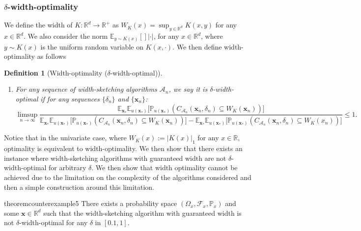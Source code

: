 \documentclass{article} %
\newtheorem{definition}{Definition}[section]
\theoremstyle{remark}
\theoremstyle{definition}      %
\begin{document}
\subsubsection{$\delta$-width-optimality}
We define the width of $K: \mathbb{R}^d \rightarrow \mathbb{R}^+$ as $W_{K}(x) = \sup_{y \in \mathbb{R}^d} K(x,y)$ for any $x \in \mathbb{R}^d$. We also consider the norm $\mathbb{E}_{y \sim K(x)}[]|\cdot|$, for any $x \in \mathbb{R}^d$, where $y \sim K(x)$ is the uniform random variable on $K(x,\cdot)$. We then define width-optimality as follows
\begin{definition}[Width-optimality ($\delta$-width-optimal)]
\begin{enumerate}[label=\arabic*),labelindent=0pt,itemsep=0pt,topsep=0pt]

\item For any sequence of width-sketching algorithms $\mathcal{A}_n$, we say it is \emph{$\delta$-width-optimal} if for any sequences $\{\delta_n\}$ and $\{\bm{x}_n\}$:
\begin{equation}
\limsup_{n \to \infty} 
\frac{
\mathbb{E}_{\bm{x}_*} \mathbb{E}_{u(\bm{x_*})}\big[\mathbb{P}_{u(\bm{x_*})}(C_{\mathcal{A}_n}(\bm{x}_n, \delta_n) \subseteq W_K(\bm{x}_n))\big]
}{
\mathbb{E}_{\bm{x}_*} \mathbb{E}_{u(\bm{x_*})}\big[\mathbb{P}_{u(\bm{x_*})}(C_{\mathcal{A}_n}(\bm{x}_n, \delta_n) \subseteq W_K(\bm{x}_n))\big]
-
\mathbb{E}_{\bm{x}_*} \mathbb{E}_{u(\bm{x_*})}\big[\mathbb{P}_{u(\bm{x_*})}(C_{\mathcal{A}_n}(\bm{x}_n, \delta_n) \subseteq W_K(x_n))\big]
} 
\le 1.
\end{equation}
\end{enumerate}
\end{definition}

Notice that in the univariate case, where $W_{K}(x) := |K(x)|_1$ for any $x \in \mathbb{R}$, optimality is equivalent to width-optimality. We then show that there exists an instance where width-sketching algorithms with guaranteed width are not $\delta$-width-optimal for arbitrary $\delta$. 
We then show that width optimality cannot be achieved due to the limitation on the complexity of the algorithms considered and then a simple construction around this limitation.
\begin{restatable}{theorem}{counterexample5}\label{prop:counterexample5}
  There exists a probability space $(\Omega_x, \mathcal{F}_x,\mathbb{P}_x)$ and some $\bm{x} \in \mathbb{R}^d$ such that the width-sketching algorithm with guaranteed width is not $\delta$-width-optimal for any $\delta$ in $[0.1,1]$. 
\end{restatable}
\end{document}
